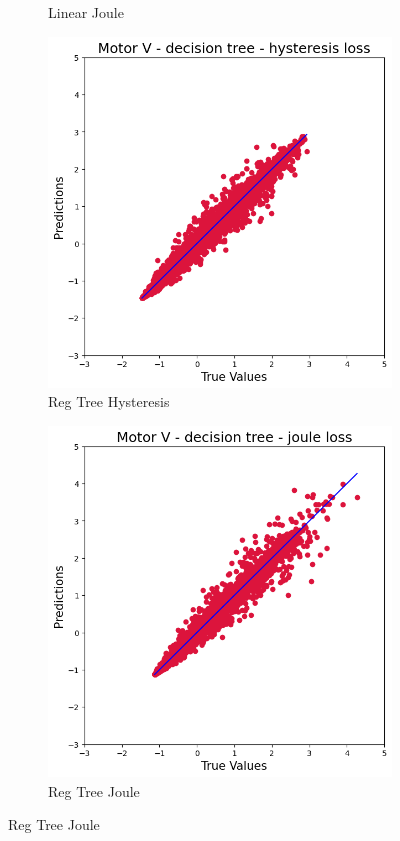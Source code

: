\documentclass{article}
\begin{document}
\begin{figure}[!htbp]
\begin{subfigure}[b]{0.23\textwidth}
        \caption{Linear Joule}
    \end{subfigure}
    \hfill
    \begin{subfigure}[b]{0.23\textwidth}
        \centering
        \includegraphics[width=\textwidth]{images/V/reg_tree_hysteresis.png}
        \caption{Reg Tree Hysteresis}
    \end{subfigure}
    \hfill
    \begin{subfigure}[b]{0.23\textwidth}
        \centering
        \includegraphics[width=\textwidth]{images/V/reg_tree_joule.png}
        \caption{Reg Tree Joule}
    \end{subfigure}
    

\end{figure}
\end{document}
